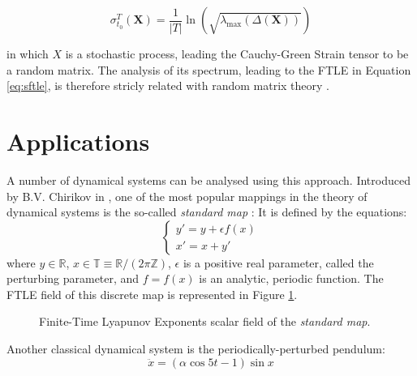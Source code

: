 \documentclass{juliacon}
\begin{document}
\begin{equation}
    \label{eq:sftle}
    \sigma_{t_0}^T(\mathbf{X})=\frac{1}{|T|}\ln(\sqrt{\lambda_{\max}(\Delta(\mathbf{X}))})
\end{equation}

in which $X$ is a stochastic process, leading the Cauchy-Green Strain tensor to be a random matrix. The analysis
of its spectrum, leading to the FTLE in Equation \eqref{eq:sftle}, is therefore stricly related with random matrix theory \cite{potters_bouchaud_2020}.

\section{Applications}
A number of dynamical systems can be analysed using this approach.
Introduced by B.V. Chirikov in \cite{CHIRIKOV1979263}, one of the most popular mappings in the theory of dynamical systems is the so-called \emph{standard map} \cite{celletti}:
It is defined by the equations:
\begin{equation}
    \begin{cases}
    y'=y+\epsilon f(x) \\
    x'=x+y'
\end{cases}
\end{equation}
where $y\in\mathbb{R}$, $x\in\mathbb{T}\equiv \mathbb{R}/(2\pi\mathbb{Z})$, $\epsilon$ is a positive real parameter, called the perturbing parameter, and $f = f(x)$ is an analytic, periodic function.
The FTLE field of this discrete map is represented in Figure \ref{fig:stdmap}.

\begin{figure}[h]
    \centering
    \caption{Finite-Time Lyapunov Exponents scalar field of the \emph{standard map}.}
    \label{fig:stdmap}
\end{figure}

Another classical dynamical system is the periodically-perturbed pendulum:
\begin{equation}
\ddot{x}=(\alpha \cos5t -1 )\sin x
\end{equation}
\end{document}
